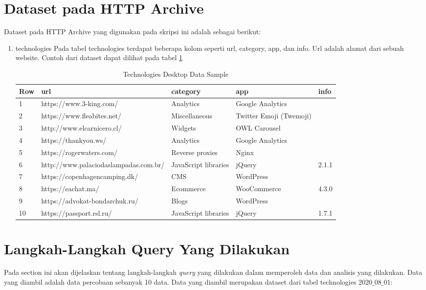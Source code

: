\section{Dataset pada HTTP Archive}
Dataset pada HTTP Archive yang digunakan pada skripsi ini adalah sebagai berikut:
\begin{enumerate}
	\item technologies
	Pada tabel technologies terdapat beberapa kolom seperti url, category, app, dan info. Url adalah alamat dari sebuah website. Contoh dari dataset dapat dilihat pada tabel \ref{table:ct_tech_desktop} 
	\begin{table}[H]
		\centering
		\begin{tabular}{|l|l|p{3cm}|p{3cm}|l|}
			\hline
			\textbf{Row} & \textbf{url} & \textbf{category} & app & info\\
			\hline
			1 & https://www.3-king.com/ & Analytics & Google Analytics & \\
			\hline
			2 & https://www.fleabites.net/ & Miscellaneous & Twitter Emoji (Twemoji) & \\
			\hline
			3 & http://www.elcarnicero.cl/ & Widgets & OWL Carousel & \\
			\hline
			4 & https://thankyou.ws/ & Analytics & Google Analytics & \\
			\hline
			5 & https://rogerwaters.com/ & Reverse proxies & Nginx & \\
			\hline
			6 & http://www.palaciodaslampadas.com.br/ & JavaScript libraries & jQuery & 2.1.1\\
			\hline
			7 & https://copenhagencamping.dk/ & CMS & WordPress & \\
			\hline
			8 & https://eachat.ma/ & Ecommerce & WooCommerce & 4.3.0\\
			\hline
			9 & https://advokat-bondarchuk.ru/ & Blogs & WordPress & \\
			\hline
			10 & https://passport.rsl.ru/ & JavaScript libraries & jQuery & 1.7.1\\
			\hline
		\end{tabular}
		\caption{Technologies Desktop Data Sample}
		\label{table:ct_tech_desktop}
	\end{table}
\end{enumerate}

\section{Langkah-Langkah Query Yang Dilakukan}
\label{langkah_query}
Pada section ini akan dijelaskan tentang langkah-langkah \textit{query} yang dilakukan dalam memperoleh data dan analisis yang dilakukan. Data yang diambil adalah data percobaan sebanyak 10 data. Data yang diambil merupakan dataset dari tabel technologies 2020$\_$08$\_$01:


